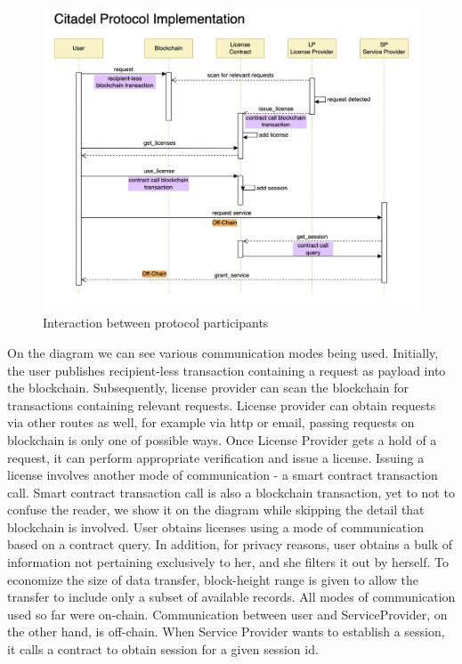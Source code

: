 \begin{figure}[h]
	\centering
		\includegraphics[width=390pt,draft=false]{images/implementation.png}
	\caption{Interaction between protocol participants}
	\label{fig:implementation}
\end{figure}

\begin{flushleft}
On the diagram we can see various communication modes being used. Initially, the user publishes recipient-less transaction containing a request as payload into the blockchain. Subsequently, license provider can scan the blockchain for transactions containing relevant requests. License provider can obtain requests via other routes as well, for example via http or email, passing requests on blockchain is only one of possible ways. Once License Provider gets a hold of a request, it can perform appropriate verification and issue a license. Issuing a license involves another mode of communication - a smart contract transaction call. Smart contract transaction call is also a blockchain transaction, yet to not to confuse the reader, we show it on the diagram while skipping the detail that blockchain is involved. User obtains licenses using a mode of communication based on a contract query. In addition, for privacy reasons, user obtains a bulk of information not pertaining exclusively to her, and she filters it out by herself. To economize the size of data transfer, block-height range is given to allow the transfer to include only a subset of available records. All modes of communication used so far were on-chain. Communication between user and ServiceProvider, on the other hand, is off-chain. When Service Provider wants to establish a session, it calls a contract to obtain session for a given session id.
\end{flushleft}

